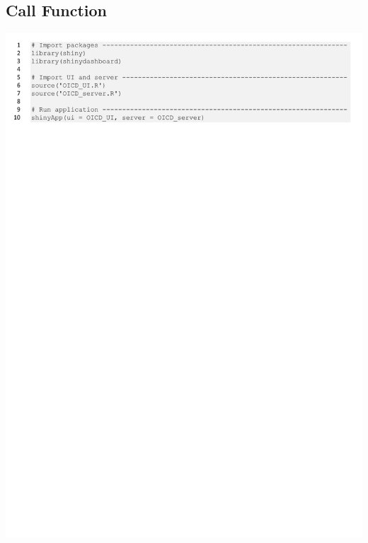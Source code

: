 \hypertarget{call function}{} \subsection*{Call Function}
\begin{center}
    \includegraphics[scale=0.75, page = 1]{files/RUN.pdf}
\end{center}
